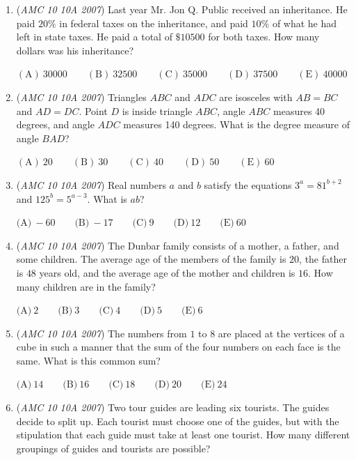 \begin{enumerate}
 $\text{(A)}\ 2002\ \text{and}\ 2003 \qquad \text{(B)}\ 2003\ \text{and}\ 2004 \qquad \text{(C)}\ 2004\ \text{and}\ 2005 \qquad \text{(D)}\ 2005\ \text{and}\ 2006 \qquad \text{(E)}\ 2006\ \text{and}\ 2007$


	\item (\textit{AMC 10 10A 2007}) Last year Mr. Jon Q. Public received an inheritance. He paid $20\%$ in federal taxes on the inheritance, and paid $10\%$ of what he had left in state taxes. He paid a total of $\$10500$ for both taxes. How many dollars was his inheritance?


 $(\mathrm {A})\ 30000 \qquad (\mathrm {B})\ 32500 \qquad(\mathrm {C})\ 35000 \qquad(\mathrm {D})\ 37500 \qquad(\mathrm {E})\ 40000$


	\item (\textit{AMC 10 10A 2007}) Triangles $ABC$ and $ADC$ are isosceles with $AB=BC$ and $AD=DC$. Point $D$ is inside triangle $ABC$, angle $ABC$ measures 40 degrees, and angle $ADC$ measures 140 degrees. What is the degree measure of angle $BAD$?


 $\mathrm{(A)}\ 20\qquad \mathrm{(B)}\ 30\qquad \mathrm{(C)}\ 40\qquad \mathrm{(D)}\ 50\qquad \mathrm{(E)}\ 60$


	\item (\textit{AMC 10 10A 2007}) Real numbers $a$ and $b$ satisfy the equations $3^{a} = 81^{b + 2}$ and $125^{b} = 5^{a - 3}$. What is $ab$?


 $\text{(A)}\ -60 \qquad \text{(B)}\ -17 \qquad \text{(C)}\ 9 \qquad \text{(D)}\ 12 \qquad \text{(E)}\ 60$


	\item (\textit{AMC 10 10A 2007}) The Dunbar family consists of a mother, a father, and some children. The average age of the members of the family is $20$, the father is $48$ years old, and the average age of the mother and children is $16$. How many children are in the family?


 $\text{(A)}\ 2 \qquad \text{(B)}\ 3 \qquad \text{(C)}\ 4 \qquad \text{(D)}\ 5 \qquad \text{(E)}\ 6$


	\item (\textit{AMC 10 10A 2007}) The numbers from $1$ to $8$ are placed at the vertices of a cube in such a manner that the sum of the four numbers on each face is the same. What is this common sum?


 $\text{(A)}\ 14 \qquad \text{(B)}\ 16 \qquad \text{(C)}\ 18 \qquad \text{(D)}\ 20 \qquad \text{(E)}\ 24$


	\item (\textit{AMC 10 10A 2007}) Two tour guides are leading six tourists. The guides decide to split up. Each tourist must choose one of the guides, but with the stipulation that each guide must take at least one tourist. How many different groupings of guides and tourists are possible?



\end{enumerate}
